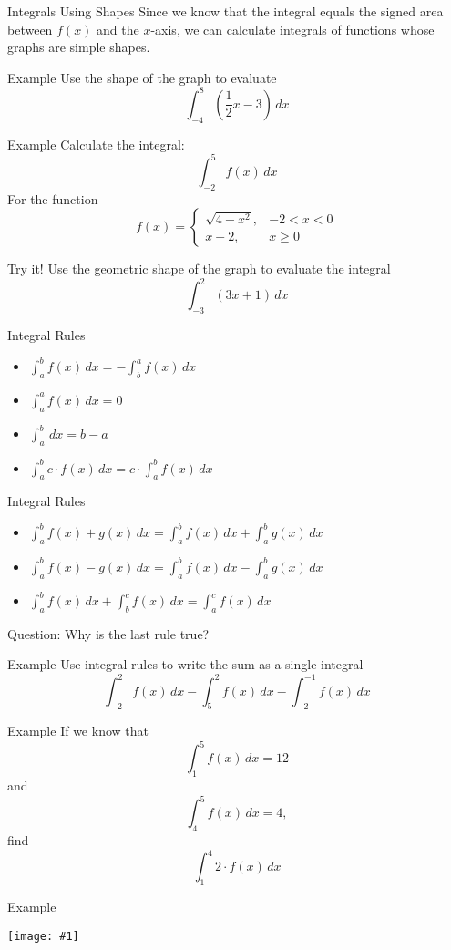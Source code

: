 \documentclass[t]{beamer}
\newcommand{\img}[1]{
\vfill
\begin{center}
\texttt{[image: \#1]}
\end{center}
\vfill
}
\begin{document}
\begin{frame}{Integrals Using Shapes}
Since we know that the integral equals the signed area between $f(x)$ and the $x$-axis, we can calculate integrals of functions whose graphs are simple shapes.
\end{frame}

\begin{frame}{Example}
Use the shape of the graph to evaluate
$$\int_{-4}^8 \left( \frac{1}{2}x - 3 \right) \, dx$$
\end{frame}

\begin{frame}{Example}
Calculate the integral:
$$\int_{-2}^5 f(x) \, dx $$
For the function
$$
f(x) = \begin{cases}
\sqrt{4 - x^2}, & -2 < x < 0 \\
x +2, & x \ge 0
\end{cases}
$$
\end{frame}

\begin{frame}{Try it!}
Use the geometric shape of the graph to evaluate the integral
$$
\int_{-3}^2 (3x + 1) \, dx
$$
\end{frame}

\begin{frame}{Integral Rules}
\begin{itemize}
\item $\displaystyle \int_a^b f(x) \, dx = - \displaystyle \int_b^a f(x) \, dx$
\item $\displaystyle \int_a^a f(x) \, dx = 0$
\item $\displaystyle \int_a^b  \, dx = b - a$
\item $\displaystyle \int_a^b  c \cdot f(x) \, dx =  c \cdot \int_a^b f(x) \, dx$
\end{itemize}
\end{frame}

\begin{frame}{Integral Rules}
\begin{itemize}
\item $\displaystyle \int_a^b f(x) + g(x) \, dx = 
\int_a^b f(x) \, dx + \int_a^b  g(x) \, dx$
\item $\displaystyle \int_a^b f(x) - g(x) \, dx = 
\int_a^b f(x) \, dx - \int_a^b  g(x) \, dx$
\item $\displaystyle \int_a^b f(x) \, dx + \int_b^c f(x) \, dx = 
\int_a^c f(x) \, dx$
\end{itemize}
Question: Why is the last rule true?
\end{frame}

\begin{frame}{Example}
Use integral rules to write the sum as a single integral
$$ \int_{-2}^2 f(x) \, dx - \int_5^2 f(x) \, dx - \int_{-2}^{-1} f(x) \, dx $$
\end{frame}

\begin{frame}{Example}
If we know that 
$$\int_1^5 f(x) \, dx = 12$$
and
$$\int_4^5 f(x) \, dx = 4, $$
find
$$\int_1^4 2 \cdot f(x) \, dx$$
\end{frame}

\begin{frame}{Example}
\img{reimann6}
\end{frame}
\end{document}
